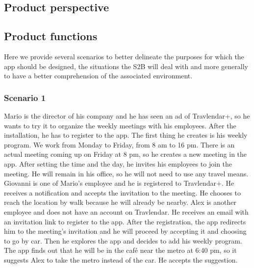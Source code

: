 \subsection{Product perspective}
\subsection{Product functions}
Here we provide several scenarios to better delineate the purposes for which the app should be designed, the situations the S2B will deal with and more generally to have a better comprehension of the associated environment.

	\subsubsection{Scenario 1}
	Mario is the director of his company and he has seen an ad of Travlendar+, so he wants to try it to organize the weekly meetings with his employees. After the installation, he has to register to the app. The first thing he creates is his weekly program. We work from Monday to Friday, from 8 am to 16 pm.\newline
	There is an actual meeting coming up on Friday at 8 pm, so he creates a new	meeting in the app. After setting the time and the day, he invites his employees to join the meeting. He will remain in his office, so he will not need to use	any travel means.\newline
	Giovanni is one of Mario's employee and he is registered to Travlendar+. He receives a notification and accepts the invitation to the meeting. He chooses to reach the location by walk because he will already be nearby.\newline
	Alex is another employee and does not have an account on Travlendar. He receives an email with an invitation link to register to the app. After the registration, the app redirects him to the meeting's invitation and he will proceed by accepting it and choosing to go by car. Then he explores the app and decides to add his weekly program. The app finds out that he will be in the café near the metro at 6:40 pm, so it suggests Alex to take the metro instead of the car. He accepts the suggestion.
